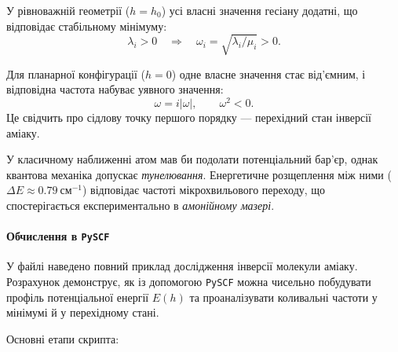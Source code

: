 У рівноважній геометрії ($h = h_0$) усі власні значення гесіану додатні, що відповідає стабільному мінімуму:
\[
\lambda_i > 0 \quad \Rightarrow \quad \omega_i = \sqrt{\lambda_i/\mu_i} > 0.
\]

Для планарної конфігурації ($h = 0$) одне власне значення стає від’ємним, і відповідна частота набуває уявного значення:
\[
\omega = i|\omega|, \qquad \omega^2 < 0.
\]
Це свідчить про сідлову точку першого порядку — перехідний стан інверсії аміаку.


У класичному наближенні атом  мав би подолати потенціальний бар’єр, однак квантова механіка допускає \emph{тунелювання}.  Енергетичне розщеплення між ними ($\Delta E \approx 0.79~\text{см}^{-1}$) відповідає частоті мікрохвильового переходу, що спостерігається експериментально в \emph{амонійному мазері}.

\paragraph{Обчислення в \texttt{PySCF}}


У файлі  наведено повний приклад дослідження
інверсії молекули аміаку. Розрахунок демонструє, як із допомогою
\texttt{PySCF} можна чисельно побудувати профіль потенціальної енергії $E(h)$
та проаналізувати коливальні частоти у мінімумі й у перехідному стані.

Основні етапи скрипта:

